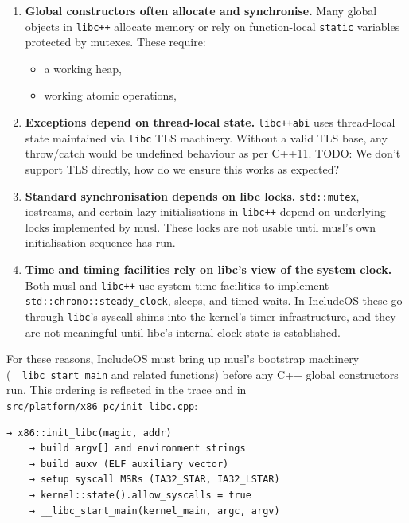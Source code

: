 \documentclass[a4paper,11pt]{article}
\begin{document}
\begin{enumerate}
  \item \textbf{Global constructors often allocate and synchronise.}  
    Many global objects in \texttt{libc++} allocate memory or rely on
    function-local \texttt{static} variables protected by mutexes.
    These require:
    \begin{itemize}
      \item a working heap,
      \item working atomic operations,
    \end{itemize}

  \item \textbf{Exceptions depend on thread-local state.}  
    \texttt{libc++abi} uses thread-local state maintained via \texttt{libc}
    TLS machinery. Without a valid TLS base, any throw/catch would be
    undefined behaviour as per C++11. TODO: We don't support TLS directly, how do we ensure this works as expected?

  \item \textbf{Standard synchronisation depends on libc locks.}  
    \texttt{std::mutex}, iostreams, and certain lazy initialisations in
    \texttt{libc++} depend on underlying locks implemented by musl. These
    locks are not usable until musl’s own initialisation sequence has
    run.

  \item \textbf{Time and timing facilities rely on libc’s view of the
    system clock.}  
    Both musl and \texttt{libc++} use system time facilities to implement
    \texttt{std::chrono::steady\_clock}, sleeps, and timed waits. In
    IncludeOS these go through \texttt{libc}'s syscall shims into the
    kernel’s timer infrastructure, and they are not meaningful until
    libc’s internal clock state is established.
\end{enumerate}

For these reasons, IncludeOS must bring up musl’s bootstrap machinery
(\texttt{\_\_libc\_start\_main} and related functions) before any C++
global constructors run. This ordering is reflected in the trace and in
\texttt{src/platform/x86\_pc/init\_libc.cpp}:

\begin{verbatim}
→ x86::init_libc(magic, addr)
    → build argv[] and environment strings
    → build auxv (ELF auxiliary vector)
    → setup syscall MSRs (IA32_STAR, IA32_LSTAR)
    → kernel::state().allow_syscalls = true
    → __libc_start_main(kernel_main, argc, argv)
\end{verbatim}
\end{document}
